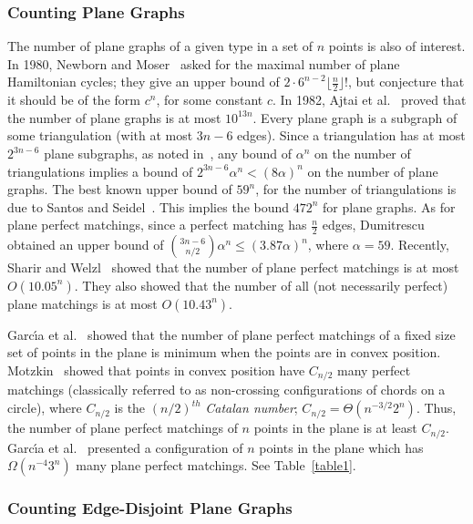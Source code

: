\documentclass[11pt,a4paper]{article}
\begin{document}
\subsubsection{Counting Plane Graphs}
The number of plane graphs of a given type in a set of $n$ points is also of interest. In 1980, Newborn and Moser~\cite{Newborn1980} asked for the maximal number of plane Hamiltonian cycles; they give an upper bound of $2\cdot6^{n-2}\lfloor\frac{n}{2}\rfloor!$, but conjecture that it should be of the form $c^n$, for some constant $c$. In 1982, Ajtai et al.~\cite{Ajtai1982} proved that the number of plane graphs is at most $10^{13n}$. Every plane graph is a subgraph of some triangulation (with at most $3n-6$ edges). Since a triangulation has at most $2^{3n-6}$ plane subgraphs, as noted in~\cite{Garcia2000}, any bound of $\alpha^n$ on the number of triangulations implies a bound of $2^{3n-6}\alpha^n<(8\alpha)^n$ on the number of plane graphs. The best known upper bound of $59^n$, for the number of triangulations is due to Santos and Seidel~\cite{Santos2003}. This implies the bound $472^n$ for plane graphs. As for plane perfect matchings, since a perfect matching has $\frac{n}{2}$ edges, Dumitrescu~\cite{Dumitrescu1999} obtained an upper bound of ${{3n-6} \choose {n/2}}\alpha^n\le (3.87\alpha)^n$, where $\alpha=59$. Recently, Sharir and Welzl~\cite{Sharir2006} showed that the number of plane perfect matchings is at most $O(10.05^n)$. They also showed that the number of all (not necessarily perfect) plane matchings is at most $O(10.43^n)$. 

Garc{\'{\i}}a et al.~\cite{Garcia2000} showed that the number of plane perfect matchings of a fixed size set of points in the plane is minimum when the points are in convex position. Motzkin~\cite{Motzkin1948} showed that points in convex position have $C_{n/2}$ many perfect matchings (classically referred to as non-crossing configurations of chords on a circle), where $C_{n/2}$ is the $(n/2)^{th}$ {\em Catalan number}; $C_{n/2}=\Theta(n^{-3/2}2^n)$. Thus, the number of plane perfect matchings of $n$ points in the plane is at least $C_{n/2}$. Garc{\'{\i}}a et al.~\cite{Garcia2000} presented a configuration of $n$ points in the plane which has $\Omega(n^{-4}3^n)$ many plane perfect matchings. See Table~\ref{table1}.

\subsubsection{Counting Edge-Disjoint Plane Graphs}
\end{document}
